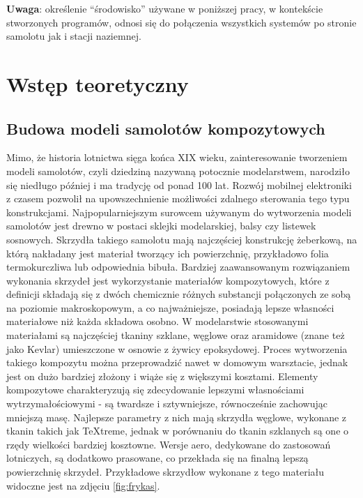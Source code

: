 \documentclass[12pt, a4paper]{article}
\begin{document}
\textbf{Uwaga}: określenie ``środowisko'' używane w poniższej pracy, w kontekście stworzonych programów, odnosi się do połączenia wszystkich systemów po stronie samolotu jak i stacji naziemnej.

\clearpage
\section{Wstęp teoretyczny}

\subsection{Budowa modeli samolotów kompozytowych}
Mimo, że historia lotnictwa sięga końca XIX wieku, zainteresowanie tworzeniem modeli samolotów, czyli dziedziną nazywaną potocznie modelarstwem, narodziło się niedługo później i ma tradycję od ponad 100 lat. Rozwój mobilnej elektroniki z czasem pozwolił na upowszechnienie możliwości zdalnego sterowania tego typu konstrukcjami. Najpopularniejszym surowcem używanym do wytworzenia modeli samolotów jest drewno w postaci sklejki modelarskiej, balsy czy listewek sosnowych. Skrzydła takiego samolotu mają najczęściej konstrukcję żeberkową, na którą nakładany jest materiał tworzący ich powierzchnię, przykładowo folia termokurczliwa lub odpowiednia bibuła. Bardziej zaawansowanym rozwiązaniem wykonania skrzydeł jest wykorzystanie materiałów kompozytowych, które z definicji składają się z dwóch chemicznie różnych substancji połączonych ze sobą na poziomie makroskopowym, a co najważniejsze, posiadają lepsze własności materiałowe niż każda składowa osobno. W modelarstwie stosowanymi materiałami są najczęściej tkaniny szklane, węglowe oraz aramidowe (znane też jako Kevlar) umieszczone w osnowie z żywicy epoksydowej. Proces wytworzenia takiego kompozytu można przeprowadzić nawet w domowym warsztacie, jednak jest on dużo bardziej złożony i wiąże się z większymi kosztami. Elementy kompozytowe charakteryzują się zdecydowanie lepszymi własnościami wytrzymałościowymi - są twardsze i sztywniejsze, równocześnie zachowując mniejszą masę. Najlepsze parametry z nich mają skrzydła węglowe, wykonane z tkanin takich jak TeXtreme, jednak w porównaniu do tkanin szklanych są one o rzędy wielkości bardziej kosztowne. Wersje aero, dedykowane do zastosowań lotniczych, są dodatkowo prasowane, co przekłada się na finalną lepszą powierzchnię skrzydeł. Przykładowe skrzydłow wykonane z tego materiału widoczne jest na zdjęciu \ref{fig:frykas}.
\end{document}
